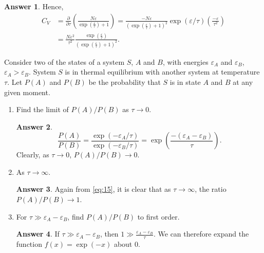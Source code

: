 \documentclass[12pt]{article}
\newenvironment{problem}[2][Problem]{\begin{trivlist}
    \item[\hskip \labelsep {\bfseries #1}\hskip \labelsep {\bfseries #2.}]}{\end{trivlist}}
\theoremstyle{definition}
\newtheorem*{answer}{Answer}
\begin{document}
\begin{problem}{3}
\begin{enumerate}[label=(\alph*)]
\begin{answer}
            Hence,
            \begin{align}
            \label{eq:14}
              C_V &= \frac{\partial }{\partial \tau} \left( \frac{N\varepsilon}{\exp(\frac{\varepsilon}{\tau}) + 1} \right) = \frac{-N\varepsilon}{(\exp(\frac{\varepsilon}{\tau}) + 1)^2} \exp(\varepsilon/\tau) \left( \frac{-\varepsilon}{\tau^2} \right) \\
              &= \boxed{\frac{N \varepsilon^2}{\tau^2} \frac{\exp( \frac{\varepsilon}{\tau} )}{(\exp(\frac{\varepsilon}{\tau}) + 1)^2}}.
            \end{align}
          \end{answer}
  \end{enumerate}
\end{problem}

\begin{problem}{4}
  Consider two of the states of a system \( S \), \( A \) and \( B \), with energies \( \varepsilon_A \) and \( \varepsilon_B \), \( \varepsilon_A > \varepsilon_B \).
  System \( S \) is in thermal equilibrium with another system at temperature \(\tau\).
  Let \( P(A) \) and \( P(B) \) be the probability that \( S \) is in state \( A  \) and \( B \) at any given moment.
  \begin{enumerate}[label=(\alph*)]
    \item Find the limit of \( P(A)/P(B) \) as \( \tau \rightarrow 0 \).
          \begin{answer}
            \begin{equation}
            \label{eq:15}
            \frac{P(A)}{P(B)} = \frac{\exp(-\varepsilon_A/\tau)}{\exp(-\varepsilon_B/\tau)} = \exp(\frac{-(\varepsilon_{A}-\varepsilon_B)}{\tau}).
            \end{equation}
            Clearly, as \(\tau \rightarrow 0\), \( \boxed{P(A)/P(B) \rightarrow 0} \).
          \end{answer}
    \item As \(\tau \rightarrow \infty\).
          \begin{answer}
            Again from \cref{eq:15}, it is clear that as \(\tau \rightarrow \infty\), the ratio \( \boxed{P(A)/P(B) \rightarrow 1} \).
          \end{answer}
    \item For \(\tau \gg \varepsilon_A - \varepsilon_B\), find \( P(A)/P(B) \) to first order.
          \begin{answer}
            If \(\tau \gg \varepsilon_A - \varepsilon_B\), then \( 1 \gg \frac{\varepsilon_A - \varepsilon_B}{\tau} \).
            We can therefore expand the function \( f(x) = \exp(-x) \) about \( 0 \).


\end{answer}
\end{enumerate}
\end{problem}
\end{document}
